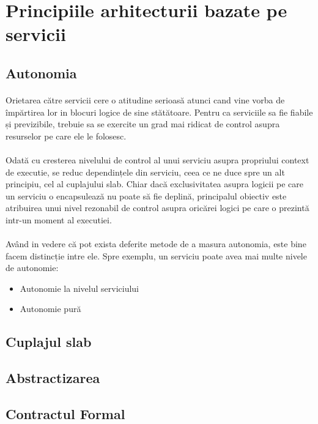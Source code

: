 \documentclass[12pt]{report}
\begin{document}
  	\section{Principiile arhitecturii bazate pe servicii}
  	\subsection{Autonomia}
  	\paragraph{}Orietarea către servicii cere o atitudine serioasă atunci cand vine vorba de împărtirea lor in blocuri logice de sine stătătoare. Pentru ca serviciile sa fie fiabile și previzibile, trebuie sa se exercite un grad mai ridicat de control asupra resurselor pe care ele le folosesc.
  	\paragraph{}Odată cu cresterea nivelului de control al unui serviciu asupra propriului context de executie, se reduc dependințele din serviciu, ceea ce ne duce spre un alt principiu, cel al cuplajului slab. Chiar dacă exclusivitatea asupra logicii pe care un serviciu o encapsulează nu poate să fie deplină, principalul obiectiv este atribuirea unui nivel rezonabil de control asupra oricărei logici pe care o prezintă intr-un moment al executiei.
  	\paragraph{}Având in vedere că pot exista deferite metode de a masura autonomia, este bine facem distincție intre ele. Spre exemplu, un serviciu poate avea mai multe nivele de autonomie:
    \begin{itemize}
    \item Autonomie la nivelul serviciului
    \item Autonomie pură
    \end{itemize}
  	\subsection{Cuplajul slab}
  	\subsection{Abstractizarea}
  	\subsection{Contractul Formal}
\end{document}
